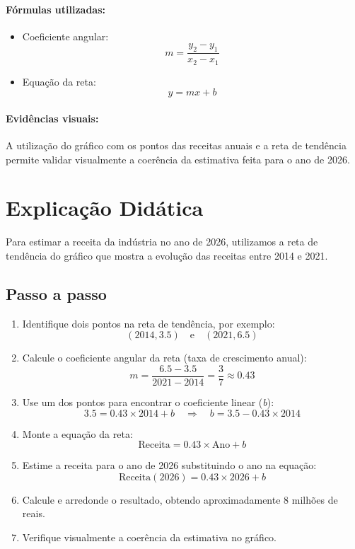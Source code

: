 \documentclass{article}
\begin{document}
\paragraph{Fórmulas utilizadas:}
\begin{itemize}
  \item Coeficiente angular:
  \[
m= \frac{y_2 - y_1}{x_2 - x_1}
  \]
  \item Equação da reta:
  \[
y = mx + b
  \]
\end{itemize}

\paragraph{Evidências visuais:} A utilização do gráfico com os pontos das receitas anuais e a reta de tendência permite validar visualmente a coerência da estimativa feita para o ano de 2026.

\section*{Explicação Didática}

Para estimar a receita da indústria no ano de 2026, utilizamos a reta de tendência do gráfico que mostra a evolução das receitas entre 2014 e 2021.

\subsection*{Passo a passo}
\begin{enumerate}
  \item Identifique dois pontos na reta de tendência, por exemplo:
  \[(2014, 3.5) \quad \mathrm{e} \quad (2021, 6.5)\]

  \item Calcule o coeficiente angular da reta (taxa de crescimento anual):
  \[
m = \frac{6.5 - 3.5}{2021 - 2014} = \frac{3}{7} \approx 0.43
  \]

  \item Use um dos pontos para encontrar o coeficiente linear (\textit{b}):
  \[
3.5 = 0.43 \times 2014 + b \quad \Rightarrow \quad b = 3.5 - 0.43 \times 2014
  \]

  \item Monte a equação da reta:
  \[
  \text{Receita} = 0.43 \times \text{Ano} + b
  \]

  \item Estime a receita para o ano de 2026 substituindo o ano na equação:
  \[
  \text{Receita}(2026) = 0.43 \times 2026 + b
  \]

  \item Calcule e arredonde o resultado, obtendo aproximadamente 8 milhões de reais.

  \item Verifique visualmente a coerência da estimativa no gráfico.
\end{enumerate}
\end{document}
